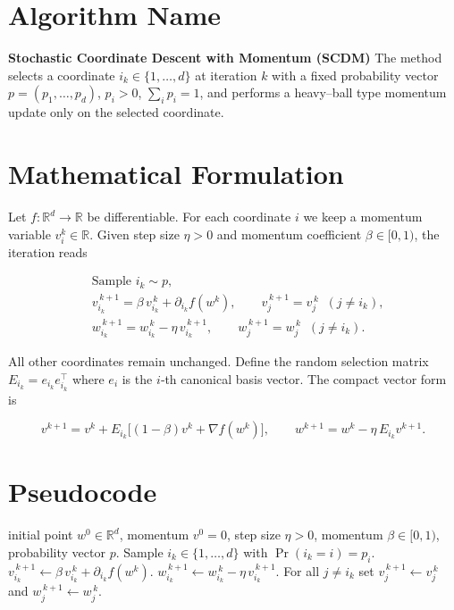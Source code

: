 \documentclass[11pt]{article}
\newcommand{\R}{\mathbb{R}}
\newcommand{\grad}{\nabla}
\begin{document}
\section*{Algorithm Name}
\textbf{Stochastic Coordinate Descent with Momentum (SCDM)}  
The method selects a coordinate $i_k\in\{1,\dots,d\}$ at iteration $k$ with a fixed probability vector $p=(p_1,\dots,p_d)$, $p_i>0$, $\sum_i p_i=1$, and performs a heavy–ball type momentum update only on the selected coordinate.

\section*{Mathematical Formulation}
Let $f:\R^{d}\rightarrow\R$ be differentiable.  
For each coordinate $i$ we keep a momentum variable $v_i^k\in\R$.  
Given step size $\eta>0$ and momentum coefficient $\beta\in[0,1)$, the iteration reads

\[
\boxed{
\begin{aligned}
&\text{Sample } i_k\sim p,\\[4pt]
&v_{i_k}^{\,k+1}= \beta\, v_{i_k}^{\,k}+ \partial_{i_k} f(w^{k}),\qquad 
   v_{j}^{\,k+1}=v_{j}^{\,k}\;\;(j\neq i_k),\\[4pt]
&w_{i_k}^{\,k+1}= w_{i_k}^{\,k}-\eta\, v_{i_k}^{\,k+1},\qquad 
   w_{j}^{\,k+1}= w_{j}^{\,k}\;\;(j\neq i_k).
\end{aligned}}
\]

All other coordinates remain unchanged.  
Define the random selection matrix $E_{i_k}=e_{i_k}e_{i_k}^{\top}$ where $e_i$ is the $i$‑th canonical basis vector.  The compact vector form is

\[
v^{k+1}=v^{k}+E_{i_k}\bigl[(1-\beta)v^{k}+ \grad f(w^{k})\bigr],
\qquad 
w^{k+1}=w^{k}-\eta\,E_{i_k}v^{k+1}.
\]

\section*{Pseudocode}
\begin{algorithm}[H]
\caption{Stochastic Coordinate Descent with Momentum}
\begin{algorithmic}[1]
\Require initial point $w^{0}\in\R^{d}$, momentum $v^{0}=0$, step size $\eta>0$, momentum $\beta\in[0,1)$, probability vector $p$.
    \State Sample $i_k\in\{1,\dots,d\}$ with $\Pr(i_k=i)=p_i$.
    \State $v_{i_k}^{\,k+1}\gets \beta\, v_{i_k}^{\,k}+ \partial_{i_k} f(w^{k})$.
    \State $w_{i_k}^{\,k+1}\gets w_{i_k}^{\,k}-\eta\, v_{i_k}^{\,k+1}$.
    \State For all $j\neq i_k$ set $v_{j}^{\,k+1}\gets v_{j}^{\,k}$ and $w_{j}^{\,k+1}\gets w_{j}^{\,k}$.
\EndFor
\end{algorithmic}
\end{algorithm}
\end{document}
